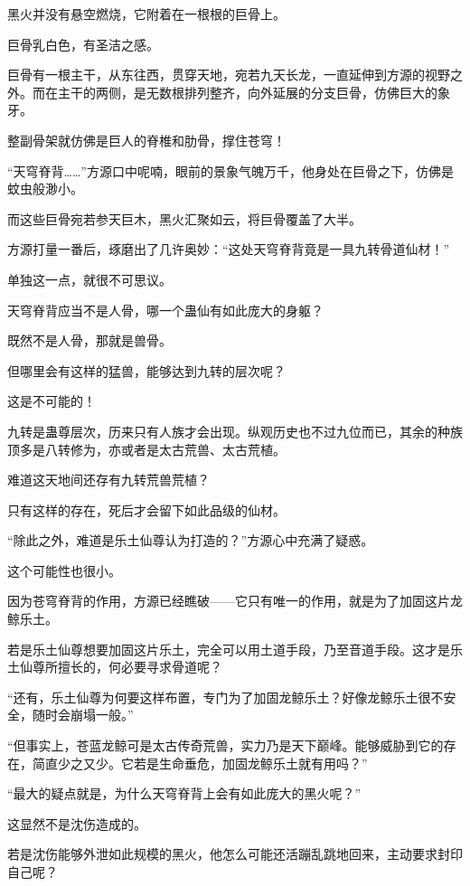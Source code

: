 
\begin{this_body}

黑火并没有悬空燃烧，它附着在一根根的巨骨上。

巨骨乳白色，有圣洁之感。

巨骨有一根主干，从东往西，贯穿天地，宛若九天长龙，一直延伸到方源的视野之外。而在主干的两侧，是无数根排列整齐，向外延展的分支巨骨，仿佛巨大的象牙。

整副骨架就仿佛是巨人的脊椎和肋骨，撑住苍穹！

“天穹脊背……”方源口中呢喃，眼前的景象气魄万千，他身处在巨骨之下，仿佛是蚊虫般渺小。

而这些巨骨宛若参天巨木，黑火汇聚如云，将巨骨覆盖了大半。

方源打量一番后，琢磨出了几许奥妙：“这处天穹脊背竟是一具九转骨道仙材！”

单独这一点，就很不可思议。

天穹脊背应当不是人骨，哪一个蛊仙有如此庞大的身躯？

既然不是人骨，那就是兽骨。

但哪里会有这样的猛兽，能够达到九转的层次呢？

这是不可能的！

九转是蛊尊层次，历来只有人族才会出现。纵观历史也不过九位而已，其余的种族顶多是八转修为，亦或者是太古荒兽、太古荒植。

难道这天地间还存有九转荒兽荒植？

只有这样的存在，死后才会留下如此品级的仙材。

“除此之外，难道是乐土仙尊认为打造的？”方源心中充满了疑惑。

这个可能性也很小。

因为苍穹脊背的作用，方源已经瞧破——它只有唯一的作用，就是为了加固这片龙鲸乐土。

若是乐土仙尊想要加固这片乐土，完全可以用土道手段，乃至音道手段。这才是乐土仙尊所擅长的，何必要寻求骨道呢？

“还有，乐土仙尊为何要这样布置，专门为了加固龙鲸乐土？好像龙鲸乐土很不安全，随时会崩塌一般。”

“但事实上，苍蓝龙鲸可是太古传奇荒兽，实力乃是天下巅峰。能够威胁到它的存在，简直少之又少。它若是生命垂危，加固龙鲸乐土就有用吗？”

“最大的疑点就是，为什么天穹脊背上会有如此庞大的黑火呢？”

这显然不是沈伤造成的。

若是沈伤能够外泄如此规模的黑火，他怎么可能还活蹦乱跳地回来，主动要求封印自己呢？


\end{this_body}
